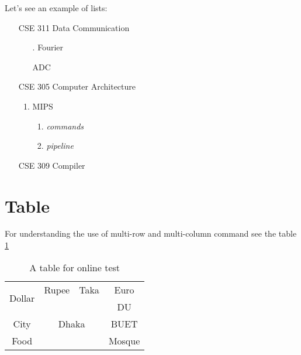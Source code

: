 \documentclass{article}
\begin{document}
Let’s see an example of lists: 
\begin{itemize}
    \item [CSE 311] Data Communication
    \begin{itemize}
        \item [.] Fourier
        \item [] ADC
    \end{itemize}
    \item [CSE 305] Computer Architecture
    \begin{enumerate}
        \item MIPS
        \begin{enumerate}[label = (\alph*)] %
            \item \textit{commands}
            \item \textit{pipeline}
        \end{enumerate}
    \end{enumerate}
    \item [CSE 309] Compiler
\end{itemize}

\section{Table}

For understanding the use of multi-row and multi-column command see the table \ref{tab:1}

\begin{table}[!h]
    \centering
    \begin{tabular}{|c|c c c|}
        \hline
        \multirow{2}{*}{Dollar} & Rupee & \multicolumn{1}{|c}{Taka} & Euro \\ \cline{2-4}
         & \multicolumn{2}{c}{\multirow{3}{*}{Dhaka}} & \multicolumn{1}{|c|}{DU} \\ \cline{4-4}
         City & & &  \multicolumn{1}{c|}{BUET} \\ \cline{1-1} \cline{4-4}
         Food & & & \multicolumn{1}{|c|}{Mosque} \\
         \hline
    \end{tabular}
    \caption{A table for online test}
    \label{tab:1}
\end{table}

\Large
\end{document}
